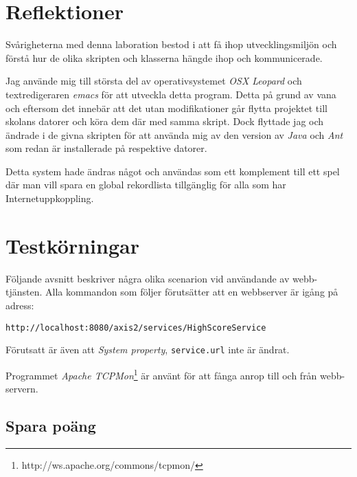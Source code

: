 \documentclass[a4paper, 12pt]{article}
\begin{document}
\section{Reflektioner}\label{Reflektioner}

Svårigheterna med denna laboration bestod i att få ihop
utvecklingsmiljön och förstå hur de olika skripten och klasserna
hängde ihop och kommunicerade.

Jag använde mig till största del av operativsystemet \textit{OSX
  Leopard} och textredigeraren \textit{emacs} för att utveckla detta
program. Detta på grund av vana och eftersom det innebär att det utan
modifikationer går flytta projektet till skolans datorer och köra dem
där med samma skript. Dock flyttade jag och ändrade i de givna
skripten för att använda mig av den version av \textit{Java} och
\textit{Ant} som redan är installerade på respektive datorer.

Detta system hade ändras något och användas som ett komplement till
ett spel där man vill spara en global rekordlista tillgänglig för alla
som har Internetuppkoppling.

\section{Testkörningar}\label{Testkorningar}
Följande avsnitt beskriver några olika scenarion vid användande av
webb-tjänsten. Alla kommandon som följer förutsätter att en webbserver
är igång på adress:
\begin{footnotesize}
\verb!http://localhost:8080/axis2/services/HighScoreService!
\end{footnotesize}

Förutsatt är även att \textit{System property}, \verb!service.url!
inte är ändrat.

Programmet \textit{Apache
  TCPMon}\footnote{http://ws.apache.org/commons/tcpmon/} är använt för
att fånga anrop till och från webb-servern.

\subsection{Spara poäng}\label{sec:spara}
\end{document}
